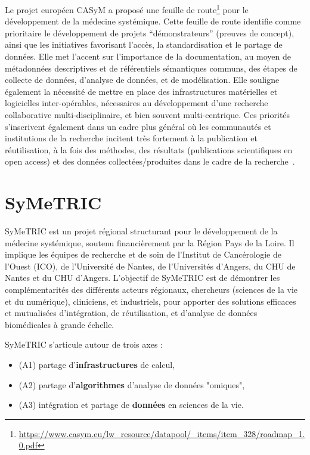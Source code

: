 \documentclass[a4paper,10pt]{article}
\theoremstyle{definition}
\begin{document}
Le projet européen CASyM a proposé une feuille de route\footnote{\url{https://www.casym.eu/lw_resource/datapool/_items/item_328/roadmap_1.0.pdf}} pour le dévelop\-pement de la médecine systémique. Cette feuille de route identifie comme prioritaire le développement de projets “démonstrateurs” (preuves de concept), ainsi que les initiatives favorisant l’accès, la standardisation et le partage de données. Elle met l’accent sur l’importance de la documentation, au moyen de métadonnées descriptives et de référentiels sémantiques communs, des étapes de collecte de données, d’analyse de données, et de modélisation. Elle souligne également la nécessité de mettre en place des infrastructures matérielles et logicielles inter-opérables, nécessaires au développement d’une recherche collaborative multi-disciplinaire, et bien souvent multi-centrique. Ces priorités s'inscrivent également dans un cadre plus général où les communautés et institutions de la recherche incitent très fortement à la publication et réutilisation, à la fois des méthodes, des résultats (publications scientifiques en open access) et des données collectées/produites dans le cadre de la recherche~\cite{wilkinson2016fair}. 

\section{SyMeTRIC}
SyMeTRIC est un projet régional structurant pour le développement de la médecine systémique, soutenu financièrement par la Région Pays de la Loire. Il implique les équipes de recherche et de soin de l’Institut de Cancérologie de l’Ouest (ICO), de l’Université de Nantes, de l’Universités d’Angers, du CHU de Nantes et du CHU d’Angers. L'objectif de SyMeTRIC est de démontrer les complémentarités des différents acteurs régionaux, chercheurs (sciences de la vie et du numérique), cliniciens, et industriels, pour apporter des solutions efficaces et mutualisées d'intégration, de réutilisation, et d'analyse de données biomédicales à grande échelle. 

\begin{tcolorbox}
SyMeTRIC s'articule autour de trois axes : 
\begin{itemize}
	\item (A1) partage d'{\bf infrastructures} de calcul,
	\item (A2) partage d'{\bf algorithmes} d'analyse de données "omiques",
	\item (A3) intégration et partage de {\bf données} en sciences de la vie. 
\end{itemize}
\end{tcolorbox}
\end{document}
